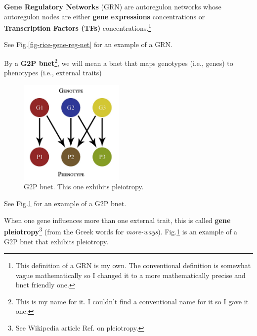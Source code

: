 {\bf Gene Regulatory Networks} (GRN) are autoregulon networks 
whose autoregulon nodes are either {\bf gene
expressions} concentrations or {\bf Transcription Factors (TFs)} concentrations.\footnote{This definition of a GRN is my own. 
The conventional definition is
somewhat vague mathematically so 
I changed it to a more mathematically precise and bnet 
friendly one.}




See Fig.\ref{fig-rice-gene-reg-net}
for an example of a GRN.



By a {\bf G2P bnet}\footnote{This is my name for it. I couldn't find a conventional name for it
so I gave it one.}, we will mean a bnet
that maps genotypes (i.e., genes) to phenotypes (i.e., external traits) 

\begin{figure}[h!]
\centering
\includegraphics[width=2in]
{gene-reg-net/bnet-more-ways.png}
\caption{G2P bnet. This
one exhibits pleiotropy.}
\label{fig-bnet-more-ways}
\end{figure}

See Fig.\ref{fig-bnet-more-ways} for an example
of a G2P bnet.

When one gene influences more than one external trait, this is called {\bf gene pleiotropy}\footnote{See Wikipedia
article Ref.\cite{wiki-pleiotropy} on pleiotropy.}
(from the Greek words for {\it more-ways}).
Fig.\ref{fig-bnet-more-ways} 
is an example of a G2P bnet that exhibits pleiotropy. 

